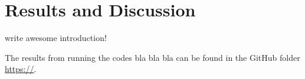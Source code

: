 \chapter{Results and Discussion}
\label{chap:Results}
write awesome introduction!

The results from running the codes bla bla bla can be found in the GitHub folder  \url{https://}.
